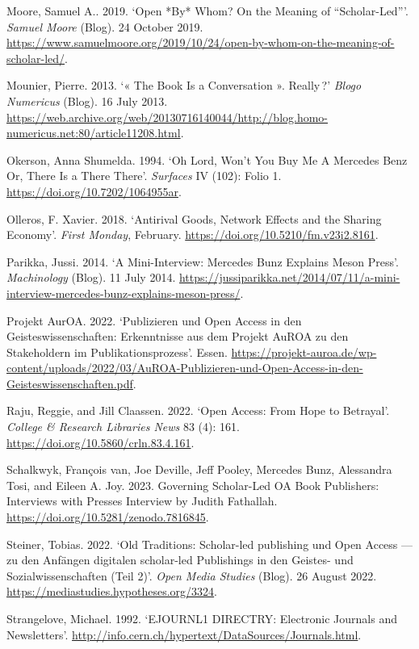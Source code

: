 \documentclass[a4paper,
fontsize=11pt,
oneside,
numbers=noperiodatend,
parskip=half-,
bibliography=totoc,
final
]{scrartcl}
\begin{document}
Moore, Samuel A.. 2019. \enquote*{Open *By* Whom? On the Meaning of
\enquote{Scholar-Led}}. \emph{Samuel Moore} (Blog). 24 October 2019.
\url{https://www.samuelmoore.org/2019/10/24/open-by-whom-on-the-meaning-of-scholar-led/}.

Mounier, Pierre. 2013. \enquote*{« The Book Is a Conversation ».
Really\,?} \emph{Blogo Numericus} (Blog). 16 July 2013.
\url{https://web.archive.org/web/20130716140044/http://blog.homo-numericus.net:80/article11208.html}.

Okerson, Anna Shumelda. 1994. \enquote*{Oh Lord, Won't You Buy Me A
Mercedes Benz Or, There Is a There There}. \emph{Surfaces} IV (102):
Folio 1. \url{https://doi.org/10.7202/1064955ar}.

Olleros, F. Xavier. 2018. \enquote*{Antirival Goods, Network Effects and
the Sharing Economy}. \emph{First Monday}, February.
\url{https://doi.org/10.5210/fm.v23i2.8161}.

Parikka, Jussi. 2014. \enquote*{A Mini-Interview: Mercedes Bunz Explains
Meson Press}. \emph{Machinology} (Blog). 11 July 2014.
\url{https://jussiparikka.net/2014/07/11/a-mini-interview-mercedes-bunz-explains-meson-press/}.

Projekt AurOA. 2022. \enquote*{Publizieren und Open Access in den
Geisteswissenschaften: Erkenntnisse aus dem Projekt AuROA zu den
Stakeholdern im Publikationsprozess}. Essen.
\url{https://projekt-auroa.de/wp-content/uploads/2022/03/AuROA-Publizieren-und-Open-Access-in-den-Geisteswissenschaften.pdf}.

Raju, Reggie, and Jill Claassen. 2022. \enquote*{Open Access: From Hope
to Betrayal}. \emph{College \& Research Libraries News} 83 (4): 161.
\url{https://doi.org/10.5860/crln.83.4.161}.

Schalkwyk, François van, Joe Deville, Jeff Pooley, Mercedes Bunz,
Alessandra Tosi, and Eileen A. Joy. 2023. Governing Scholar-Led OA Book
Publishers: Interviews with Presses Interview by Judith Fathallah.
\url{https://doi.org/10.5281/zenodo.7816845}.

Steiner, Tobias. 2022. \enquote*{Old Traditions: Scholar-led publishing
und Open Access --- zu den Anfängen digitalen scholar-led Publishings in
den Geistes- und Sozialwissenschaften (Teil 2)}. \emph{Open Media
Studies} (Blog). 26 August 2022.
\url{https://mediastudies.hypotheses.org/3324}.

Strangelove, Michael. 1992. \enquote*{EJOURNL1 DIRECTRY: Electronic
Journals and Newsletters}.
\url{http://info.cern.ch/hypertext/DataSources/Journals.html}.
\end{document}

